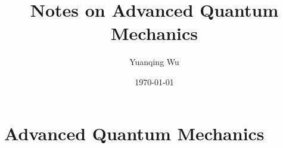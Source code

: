 \documentclass{ctexart}
\author{Yuanqing Wu}
\date{\today}
\title{Notes on Advanced Quantum Mechanics}
\begin{document}
  \maketitle
  \newpage
  \part{Advanced Quantum Mechanics}
  
\end{document}
